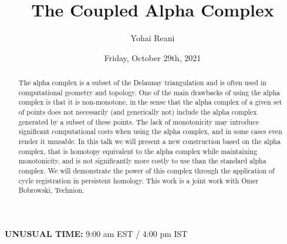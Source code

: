\documentclass{UAmathtalk}
\author{Yohai Reani}
\title{The Coupled Alpha Complex }
\date{Friday, October 29th, 2021}
\begin{document}
\maketitle

\begin{center}
\Large{{\bf UNUSUAL TIME:} 9:00 am EST / 4:00 pm IST}
\end{center}

\begin{abstract}
The alpha complex is a subset of the Delaunay triangulation and is often used in computational geometry and topology. One of the main drawbacks of using the alpha complex is that it is non-monotone, in the sense that the alpha complex of a given set of points does not necessarily (and generically not) include the alpha complex generated by a subset of these points. The lack of monotonicity may introduce significant computational costs when using the alpha complex, and in some cases even render it unusable. In this talk we will present a new construction based on the alpha complex, that is homotopy equivalent to the alpha complex while maintaining monotonicity, and is not significantly more costly to use than the standard alpha complex. We will demonstrate the power of this complex through the application of cycle registration in persistent homology. This work is a joint work with Omer Bobrowski, Technion. 
\end{abstract}
\end{document}
